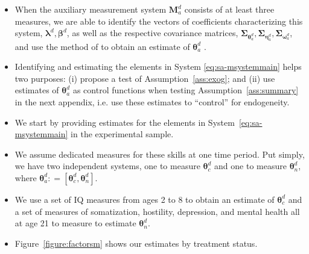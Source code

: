\documentclass[static]{JJH-Beamer}
\begin{document}
\begin{frame}
 \addtocounter{framenumber}{-1}

\begin{itemize}
\item When the auxiliary measurement system $\bm{M}_{a}^d $ consists of at least three measures, we are able to identify the vectors of coefficients characterizing this system, $\bm{\lambda}^d, \bm{\beta}^d$, as well as the respective covariance matrices, $\bm{\Sigma}_{\bm{\theta}_{a}^d}, \bm{\Sigma}_{\bm{\eta}_{a}^d}, \bm{\Sigma}_{\bm{\omega}_{a}^d}$, and use the method of \citet{Bartlett_1938_Nature} to obtain an estimate of $\bm{\theta}_{a}^d$ \citep{Heckman_Pinto_etal_2013_PerryFactor}.
\item Identifying and estimating the elements in System \eqref{eq:sa-msystemmain} helps two purposes: (i) propose a test of Assumption~\ref{ass:exog}; and (ii) use estimates of $\bm{\theta}_{a}^d$ as control functions when testing Assumption~\ref{ass:summary} in the next appendix, i.e. use these estimates to ``control'' for endogeneity.
\end{itemize}

\end{frame}

\begin{frame}
 \addtocounter{framenumber}{-1}

\begin{itemize}
\item We start by providing estimates for the elements in System~\eqref{eq:sa-msystemmain} in the experimental sample.
\item We assume dedicated measures for these skills at one time period. Put simply, we have two independent systems, one to measure $\bm{\theta}_{c}^d$ and one to measure $\bm{\theta}_{n}^d$, where $\bm{\theta}_{a}^d: = \left[ \bm{\theta}_{c}^d, \bm{\theta}_{n}^d \right]$.
\item We use a set of IQ measures from ages 2 to 8 to obtain an estimate of $\bm{\theta}_{c}^d$ and a set of measures of somatization, hostility, depression, and mental health all at age 21 to measure to estimate $\bm{\theta}_{n}^d$.
\item Figure~\ref{figure:factorsm} shows our estimates by treatment status.
\end{itemize}

\end{frame}
\end{document}
